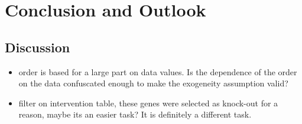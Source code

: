 \newpage
\section{Conclusion and Outlook}



\subsection{Discussion}
\begin{itemize}
    \item order is based for a large part on data values. Is the dependence of the order on the data confuscated enough to make the exogeneity assumption valid?
    \item filter on intervention table, these genes were selected as knock-out for a reason, maybe its an easier task? It is definitely a different task.

\end{itemize}
